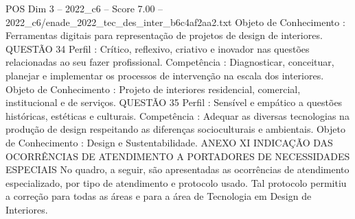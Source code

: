 \begin{textsample}{POS Dim 3 – 2022\_c6 – Score 7.00 – 2022\_c6/enade\_2022\_tec\_des\_inter\_b6c4af2aa2.txt}
Objeto de Conhecimento : Ferramentas digitais para representação de projetos de design de interiores.
QUESTÃO 34 Perfil : Crítico, reflexivo, criativo e inovador nas questões relacionadas ao seu fazer profissional.
Competência : Diagnosticar, conceituar, planejar e implementar os processos de intervenção na escala dos interiores.
Objeto de Conhecimento : Projeto de interiores residencial, comercial, institucional e de serviços.
QUESTÃO 35 Perfil : Sensível e empático a questões históricas, estéticas e culturais.
Competência : Adequar as diversas tecnologias na produção de design respeitando as diferenças socioculturais e ambientais.
Objeto de Conhecimento : Design e Sustentabilidade.
ANEXO XI INDICAÇÃO DAS OCORRÊNCIAS DE ATENDIMENTO A PORTADORES DE NECESSIDADES ESPECIAIS No quadro, a seguir, são apresentadas as ocorrências de atendimento especializado, por tipo de atendimento e protocolo usado.
Tal protocolo permitiu a correção para todas as áreas e para a área de Tecnologia em Design de Interiores.

\end{textsample}
